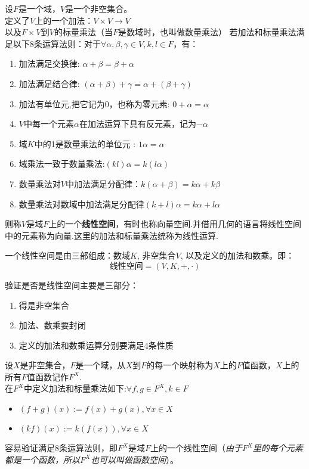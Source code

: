 \begin{definition}
    设$F$是一个域，$V$是一个非空集合。\\
    定义了$V$上的一个加法：$V \times V \rightarrow V$\\
    以及$F \times V$到$V$的标量乘法（当$F$是数域时，也叫做数量乘法）
    若加法和标量乘法满足以下$8$条运算法则：对于$\forall \alpha, \beta, \gamma \in V, k, l \in F$，有：
    \begin{enumerate}
        \item 加法满足交换律: $\alpha + \beta = \beta + \alpha$
        \item 加法满足结合律: $(\alpha + \beta) + \gamma = \alpha + (\beta + \gamma)$
        \item 加法有单位元,把它记为$0$，也称为零元素: $0 + \alpha = \alpha$
        \item $V$中每一个元素$\alpha$在加法运算下具有反元素，记为$-\alpha$
        \item 域$K$中的1是数量乘法的单位元 : $1\alpha = \alpha$
        \item 域乘法一致于数量乘法:$(kl)\alpha = k(l\alpha)$
        \item 数量乘法对$V$中加法满足分配律：$k(\alpha + \beta) = k\alpha + k\beta$
        \item 数量乘法对数域中加法满足分配律$(k+l)\alpha = k\alpha + l\alpha$
    \end{enumerate}
    则称$V$是域$F$上的一个\textbf{线性空间}，有时也称向量空间.并借用几何的语言将线性空间中的元素称为向量.这里的加法和标量乘法统称为线性运算.
\end{definition}
\begin{remark}
    一个线性空间是由三部组成：数域$K$, 非空集合$V$, 以及定义的加法和数乘。即：
    \begin{equation*}
        \text{线性空间}=(V,K,+,\cdot)
    \end{equation*}
\end{remark}

\begin{remark}
    验证是否是线性空间主要是三部分：
    \begin{enumerate}
        \item 得是非空集合
        \item 加法、数乘要封闭
        \item 定义的加法和数乘运算分别要满足$4$条性质
    \end{enumerate}
\end{remark}

\begin{example}
    设$X$是非空集合，$F$是一个域，从$X$到$F$的每一个映射称为$X$上的$F$值函数，$X$上的所有$F$值函数记作$F^X$.\\
    在$F^X$中定义加法和标量乘法如下:$\forall f,g \in F^X, k \in F$
    \begin{itemize}
        \item $(f+g)(x) := f(x) + g(x), \forall x \in X$
        \item $(kf)(x) := k(f(x)), \forall x \in X$
    \end{itemize}
    容易验证满足$8$条运算法则，即$F^X$是域$F$上的一个线性空间（\emph{由于$F^X$里的每个元素都是一个函数，所以$F^X$也可以叫做函数空间}）。
\end{example}

